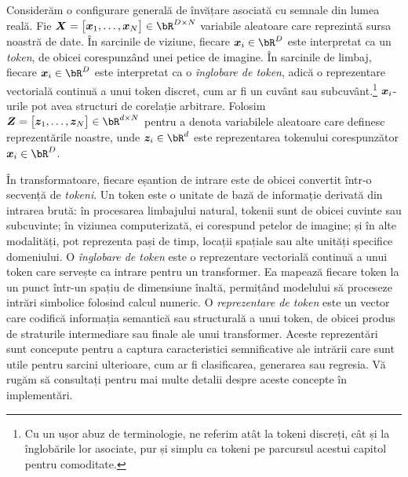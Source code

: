 \documentclass[../../book-main_ro.tex]{subfiles}
\begin{document}
Considerăm o configurare generală de învățare asociată cu semnale din lumea reală. Fie \(\X = \mat{\x_{1}, \dots, \x_{N}} \in \bR^{D \times N}\) variabile aleatoare care reprezintă sursa noastră de date. În sarcinile de viziune, fiecare \(\x_{i} \in \bR^{D}\) este interpretat ca un \textit{token}, de obicei corespunzând unei petice de imagine. În sarcinile de limbaj, fiecare \(\x_{i} \in \bR^{D}\) este interpretat ca o \textit{înglobare de token}, adică o reprezentare vectorială continuă a unui token discret, cum ar fi un cuvânt sau subcuvânt.\footnote{Cu un ușor abuz de terminologie, ne referim atât la tokeni discreți, cât și la înglobările lor asociate, pur și simplu ca tokeni pe parcursul acestui capitol pentru comoditate.}
\(\bm{x}_{i}\)-urile pot avea structuri de corelație arbitrare. Folosim \(\Z = \mat{\z_{1}, \dots, \z_{N}} \in \bR^{d \times N}\) pentru a denota variabilele aleatoare care definesc reprezentările noastre, unde \(\z_{i} \in \bR^{d}\) este reprezentarea tokenului corespunzător \(\x_i \in \bR^{D}\).

\begin{remark}
    În transformatoare, fiecare eșantion de intrare este de obicei convertit într-o secvență de {\em tokeni}. Un token este o unitate de bază de informație derivată din intrarea brută: în procesarea limbajului natural, tokenii sunt de obicei cuvinte sau subcuvinte; în viziunea computerizată, ei corespund petelor de imagine; și în alte modalități, pot reprezenta pași de timp, locații spațiale sau alte unități specifice domeniului. O {\em înglobare de token} este o reprezentare vectorială continuă a unui token care servește ca intrare pentru un transformer. Ea mapează fiecare token la un punct într-un spațiu de dimensiune înaltă, permițând modelului să proceseze intrări simbolice folosind calcul numeric.
    O {\em reprezentare de token} este un vector care codifică informația semantică sau structurală a unui token, de obicei produs de straturile intermediare sau finale ale unui transformer. Aceste reprezentări sunt concepute pentru a captura caracteristici semnificative ale intrării care sunt utile pentru sarcini ulterioare, cum ar fi clasificarea, generarea sau regresia. Vă rugăm să consultați  pentru mai multe detalii despre aceste concepte în implementări. 
\end{remark}


 
\end{document}
